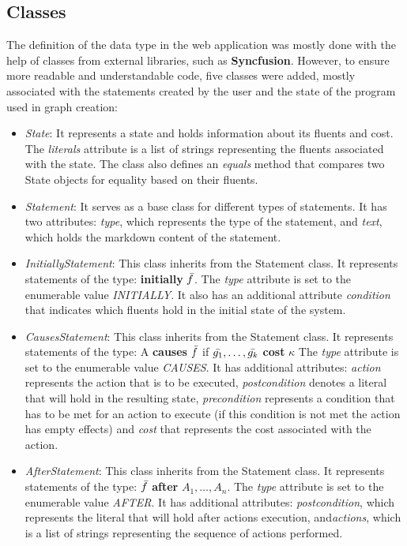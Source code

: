\documentclass[a4paper]{article}
\begin{document}
\subsection{Classes}
The definition of the data type in the web application was mostly done with the help of classes from external libraries, such as \textbf{Syncfusion}. However, to ensure more readable and understandable code, five classes were added, mostly associated with the statements created by the user and the state of the program used in graph creation:
\begin{itemize}
    \item \emph{State}: It represents a state and holds information about its fluents and cost. The \emph{literals} attribute is a list of strings representing the fluents associated with the state. The class also defines an \emph{equals} method that compares two State objects for equality based on their fluents.
    \item \emph{Statement}: It serves as a base class for different types of statements. It has two attributes: \emph{type}, which represents the type of the statement, and \emph{text}, which holds the markdown content of the statement.
    \item \emph{InitiallyStatement}:
    This class inherits from the Statement class. It represents statements of the type: \textbf{initially} $\Bar{f}$. The \emph{type} attribute is set to the enumerable value \textit{INITIALLY}. It also has an additional attribute \emph{condition} that indicates which fluents hold in the initial state of the system.
    \item \emph{CausesStatement}:
    This class inherits from the Statement class. It represents statements of the type: A \textbf{causes} $\Bar{f}$ if $\Bar{g_1},\dotsc,\Bar{g_k}$ \textbf{cost} $\kappa$ The \emph{type} attribute is set to the enumerable value \textit{CAUSES}. It has additional attributes: \emph{action} represents the action that is to be executed, \emph{postcondition} denotes a literal that will hold in the resulting state, \emph{precondition} represents a condition that has to be met for an action to execute (if this condition is not met the action has empty effects) and \emph{cost} that represents the cost associated with the action.
    \item \emph{AfterStatement}:
    This class inherits from the Statement class. It represents statements of the type: $\Bar{f}$ \textbf{after} $A_1,\dotsc,A_n$. The \emph{type} attribute is set to the enumerable value \textit{AFTER}. It has additional attributes: \emph{postcondition}, which represents the literal that will hold after actions execution, and\emph{actions}, which is a list of strings representing the sequence of actions performed.
\end{itemize}
\end{document}
